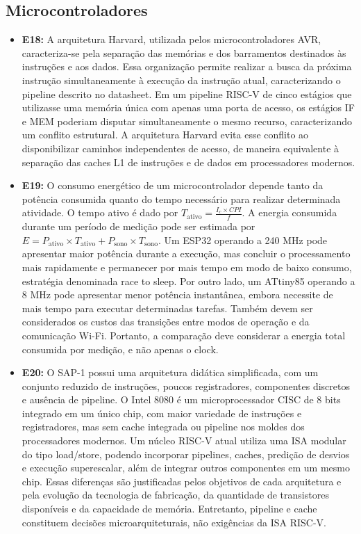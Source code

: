 \documentclass[12pt,a4paper,titlepage]{article}
\begin{document}
\subsection{Microcontroladores}
\begin{itemize}
    \item\textbf{E18:}
        A arquitetura Harvard, utilizada pelos microcontroladores AVR, caracteriza-se pela separação das memórias e dos barramentos
        destinados às instruções e aos dados. Essa organização permite realizar a busca da próxima instrução simultaneamente
        à execução da instrução atual, caracterizando o pipeline descrito no datasheet.
        Em um pipeline RISC-V de cinco estágios que utilizasse uma memória única com apenas uma porta de acesso, os estágios IF
        e MEM poderiam disputar simultaneamente o mesmo recurso, caracterizando um conflito estrutural.
        A arquitetura Harvard evita esse conflito ao disponibilizar caminhos independentes de acesso, de maneira equivalente
        à separação das caches L1 de instruções e de dados em processadores modernos.

    \item\textbf{E19:}
        O consumo energético de um microcontrolador depende tanto da potência consumida quanto do tempo necessário para realizar
        determinada atividade. O tempo ativo é dado por $T_{\mathrm{ativo}} = \frac{I_c \times CPI}{f}$.
        A energia consumida durante um período de medição pode ser estimada por
        $E = P_{\mathrm{ativo}} \times T_{\mathrm{ativo}} + P_{\mathrm{sono}} \times T_{\mathrm{sono}}$.
        Um ESP32 operando a 240 MHz pode apresentar maior potência durante a execução, mas concluir o processamento mais rapidamente
        e permanecer por mais tempo em modo de baixo consumo, estratégia denominada race to sleep.
        Por outro lado, um ATtiny85 operando a 8 MHz pode apresentar menor potência instantânea, embora necessite de mais tempo
        para executar determinadas tarefas. Também devem ser considerados os custos das transições entre modos de operação
        e da comunicação Wi-Fi. Portanto, a comparação deve considerar a energia total consumida por medição, e não apenas o clock.

    \item\textbf{E20:}
        O SAP-1 possui uma arquitetura didática simplificada, com um conjunto reduzido de instruções, poucos registradores,
        componentes discretos e ausência de pipeline.
        O Intel 8080 é um microprocessador CISC de 8 bits integrado em um único chip, com maior variedade de instruções e
        registradores, mas sem cache integrada ou pipeline nos moldes dos processadores modernos.
        Um núcleo RISC-V atual utiliza uma ISA modular do tipo load/store, podendo incorporar pipelines, caches, predição de
        desvios e execução superescalar, além de integrar outros componentes em um mesmo chip.
        Essas diferenças são justificadas pelos objetivos de cada arquitetura e pela evolução da tecnologia de fabricação,
        da quantidade de transistores disponíveis e da capacidade de memória. Entretanto, pipeline e cache constituem
        decisões microarquiteturais, não exigências da ISA RISC-V.
\end{itemize}
\end{document}
